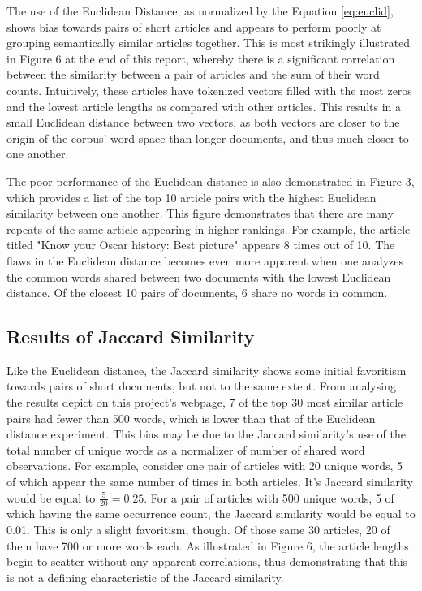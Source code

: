 \documentclass[11pt]{article}
\begin{document}
The use of the Euclidean Distance, as normalized by the Equation \ref{eq:euclid}, shows bias towards pairs of short articles and appears to perform poorly at grouping semantically similar articles together.
This is most strikingly illustrated in Figure 6 at the end of this report, whereby there is a significant correlation between the similarity between a pair of articles and the sum of their word counts.
Intuitively, these articles have tokenized vectors filled with the most zeros and the lowest article lengths as compared with other articles.
This results in a small Euclidean distance between two vectors, as both vectors are closer to the origin of the corpus' word space than longer documents, and thus much closer to one another.

The poor performance of the Euclidean distance is also demonstrated in Figure 3, which provides a list of the top 10 article pairs with the highest Euclidean similarity between one another.
This figure demonstrates that there are many repeats of the same article appearing in higher rankings.
For example, the article titled "Know your Oscar history: Best picture" appears 8 times out of 10.
The flaws in the Euclidean distance becomes even more apparent when one analyzes the common words shared between two documents with the lowest Euclidean distance.
Of the closest 10 pairs of documents, 6 share no words in common.


\subsection{Results of Jaccard Similarity}

Like the Euclidean distance, the Jaccard similarity shows some initial favoritism towards pairs of short documents, but not to the same extent.
From analysing the results depict on this project's webpage, 7 of the top 30 most similar article pairs had fewer than 500 words, which is lower than that of the Euclidean distance experiment.
This bias may be due to the Jaccard similarity's use of the total number of unique words as a normalizer of number of shared word observations.
For example, consider one pair of articles with 20 unique words, 5 of which appear the same number of times in both articles.
It's Jaccard similarity would be equal to $\frac{5}{20} = 0.25$.
For a pair of articles with 500 unique words, 5 of which having the same occurrence count, the Jaccard similarity would be equal to 0.01.
This is only a slight favoritism, though.
Of those same 30 articles, 20 of them have 700 or more words each.
As illustrated in Figure 6, the article lengths begin to scatter without any apparent correlations, thus demonstrating that this is not a defining characteristic of the Jaccard similarity.
\end{document}
